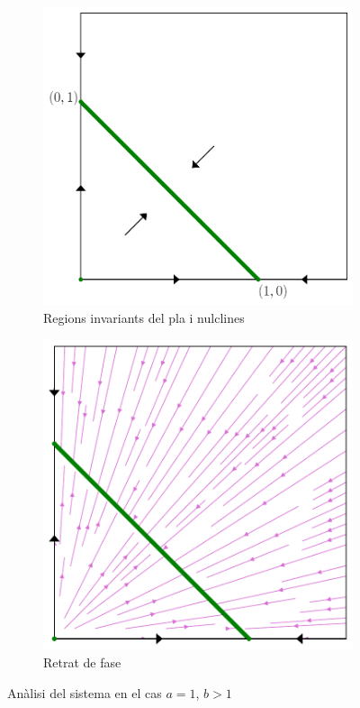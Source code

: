 \documentclass[12pt]{article}
\numberwithin{table}{section}
\numberwithin{equation}{section}
\numberwithin{figure}{section}
\begin{document}
\begin{figure}
	\centering
	\begin{subfigure}[htb]{0.48\textwidth}
		\centering
		\includegraphics[width=\textwidth]{retrat-6a.pdf}
		\caption{Regions invariants del pla i nulclines}
		\label{fig:retrat 6a}
	\end{subfigure}
	\begin{subfigure}[htb]{0.48\textwidth}
		\centering
		\includegraphics[width=\textwidth]{retrat-6b.pdf}
		\caption{Retrat de fase}
		\label{fig:retrat 6b}
	\end{subfigure}
	\caption{Anàlisi del sistema en el cas \( a = 1 \), \( b > 1 \)}
	\label{fig:retrat 6}
\end{figure}
\end{document}
